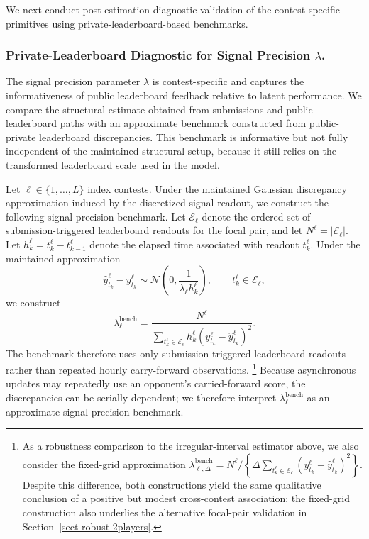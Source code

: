 \documentclass[mnsc]{informs3}
\begin{document}
We next conduct post-estimation diagnostic validation of the contest-specific primitives using private-leaderboard-based benchmarks.

\subsubsection{Private-Leaderboard Diagnostic for Signal Precision $\lambda$.}
The signal precision parameter $\lambda$ is contest-specific and captures the informativeness of public leaderboard feedback relative to latent performance. We compare the structural estimate obtained from submissions and public leaderboard paths with an approximate benchmark constructed from public-private leaderboard discrepancies.
This benchmark is informative but not fully independent of the maintained structural setup, because it still relies on the transformed leaderboard scale used in the model.

Let $\ell\in\{1,\ldots,L\}$ index contests.
Under the maintained Gaussian discrepancy approximation induced by the discretized signal readout, we construct the following signal-precision benchmark.
Let $\mathcal E_\ell$ denote the ordered set of submission-triggered leaderboard readouts for the focal pair, and let $N^\ell=|\mathcal E_\ell|$.
Let $h_k^\ell=t_k^\ell-t_{k-1}^\ell$ denote the elapsed time associated with readout $t_k^\ell$.
Under the maintained approximation
\[
\hat y_{t_k}^\ell-y_{t_k}^\ell
\sim
\mathcal N\!\left(0,\frac{1}{\lambda_\ell h_k^\ell}\right),
\qquad t_k^\ell\in\mathcal E_\ell,
\]
we construct
\begin{equation*}
\lambda^{\text{bench}}_\ell =
\frac{N^\ell}
{\sum_{t_k^\ell\in\mathcal E_\ell}
h_k^\ell (y_{t_k}^\ell - \hat{y}_{t_k}^\ell)^2}.
\end{equation*}
The benchmark therefore uses only submission-triggered leaderboard readouts rather than repeated hourly carry-forward observations.
\footnote{
As a robustness comparison to the irregular-interval estimator above, we also consider the fixed-grid approximation $\lambda_{\ell,\Delta}^{\mathrm{bench}}=N^\ell/\left\{\Delta\sum_{t_k^\ell\in\mathcal E_\ell}(y_{t_k}^\ell-\hat y_{t_k}^\ell)^2\right\}$. 
Despite this difference, both constructions yield the same qualitative conclusion of a positive but modest cross-contest association; the fixed-grid construction also underlies the alternative focal-pair validation in Section~\ref{sect-robust-2players}.
}
Because asynchronous updates may repeatedly use an opponent's carried-forward score, the discrepancies can be serially dependent; we therefore interpret $\lambda_\ell^{\mathrm{bench}}$ as an approximate signal-precision benchmark.
\end{document}
